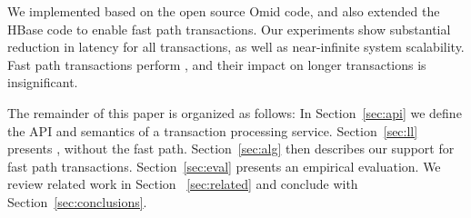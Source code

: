 We implemented {\sys\/} based on the open source Omid code, and also extended the HBase code to 
enable fast path transactions. Our experiments show substantial reduction in latency for all transactions, 
as well as near-infinite system scalability. Fast path transactions perform , and their impact on longer transactions is insignificant. 

The remainder of this paper is organized as follows:
In Section~\ref{sec:api} we define the  API and semantics of a transaction processing service. 
Section~\ref{sec:ll} presents \sys, without the fast path. 
Section~\ref{sec:alg} then describes our support for fast path  transactions.  
Section~\ref{sec:eval} presents an empirical evaluation.
We review related work in Section ~\ref{sec:related} and conclude with Section~\ref{sec:conclusions}.

